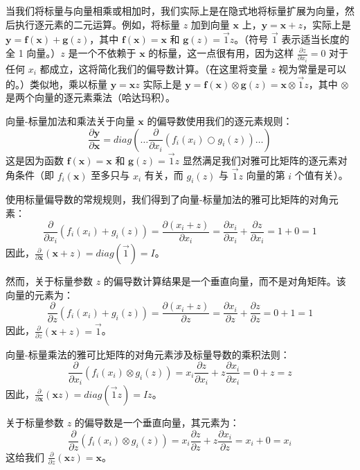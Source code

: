 \documentclass[lang=cn,newtx,10pt,scheme=chinese]{elegantbook}
\begin{document}
当我们将标量与向量相乘或相加时，我们实际上是在隐式地将标量扩展为向量，然后执行逐元素的二元运算。例如，将标量 $z$ 加到向量 $\mathbf{x}$ 上，$\mathbf{y} = \mathbf{x} + z$，实际上是 $\mathbf{y} = \mathbf{f(x)} + \mathbf{g}(z)$，其中 $\mathbf{f(x)} = \mathbf{x}$ 和 $\mathbf{g}(z) = \vec{1} z$。（符号 $\vec{1}$ 表示适当长度的全 1 向量。）$z$ 是一个不依赖于 $\mathbf{x}$ 的标量，这一点很有用，因为这样 $\frac{\partial z}{\partial x_i} = 0$ 对于任何 $x_i$ 都成立，这将简化我们的偏导数计算。（在这里将变量 $z$ 视为常量是可以的。）类似地，乘以标量 $\mathbf{y} = \mathbf{x} z$ 实际上是 $\mathbf{y} = \mathbf{f(x)} \otimes \mathbf{g}(z) = \mathbf{x} \otimes \vec{1} z$，其中 $\otimes$ 是两个向量的逐元素乘法（哈达玛积）。

向量-标量加法和乘法关于向量 $\mathbf{x}$ 的偏导数使用我们的逐元素规则：
\[ \frac{\partial \mathbf{y}}{\partial \mathbf{x}} = diag \left( \ldots \frac{\partial}{\partial x_i} ( f_i(x_i) \bigcirc g_i(z) ) \ldots \right)\]
这是因为函数 $\mathbf{f(x)} = \mathbf{x}$ 和 $\mathbf{g}(z) = \vec{1} z$ 显然满足我们对雅可比矩阵的逐元素对角条件（即 $f_i(\mathbf{x})$ 至多只与 $x_i$ 有关，而 $g_i(z)$ 与 $\vec{1} z$ 向量的第 $i$ 个值有关）。

使用标量偏导数的常规规则，我们得到了向量-标量加法的雅可比矩阵的对角元素：
\[\frac{\partial}{\partial x_i} ( f_i(x_i) + g_i(z) ) = \frac{\partial (x_i + z)}{\partial x_i} = \frac{\partial x_i}{\partial x_i} + \frac{\partial z}{\partial x_i} = 1 + 0 = 1\]
因此，$\frac{\partial}{\partial \mathbf{x}} ( \mathbf{x} + z ) = diag(\vec{1}) = I$。

然而，关于标量参数 $z$ 的偏导数计算结果是一个垂直向量，而不是对角矩阵。该向量的元素为：
\[ \frac{\partial}{\partial z} ( f_i(x_i) + g_i(z) ) = \frac{\partial (x_i + z)}{\partial z} = \frac{\partial x_i}{\partial z} + \frac{\partial z}{\partial z} = 0 + 1 = 1\]
因此，$\frac{\partial}{\partial z} ( \mathbf{x} + z ) = \vec{1}$。

向量-标量乘法的雅可比矩阵的对角元素涉及标量导数的乘积法则：
\[ \frac{\partial}{\partial x_i} ( f_i(x_i) \otimes g_i(z) ) = x_i  \frac{\partial z}{\partial x_i} + z  \frac{\partial x_i}{\partial x_i} = 0 + z = z\]
因此，$\frac{\partial}{\partial \mathbf{x}} ( \mathbf{x} z ) = diag(\vec{1}  z) = I z$。

关于标量参数 $z$ 的偏导数是一个垂直向量，其元素为：
\[\frac{\partial}{\partial z} ( f_i(x_i) \otimes g_i(z) ) = x_i \frac{\partial z}{\partial z} + z \frac{\partial x_i}{\partial z} = x_i + 0 = x_i\]
这给我们 $\frac{\partial}{\partial z} ( \mathbf{x} z ) = \mathbf{x}$。
\end{document}
